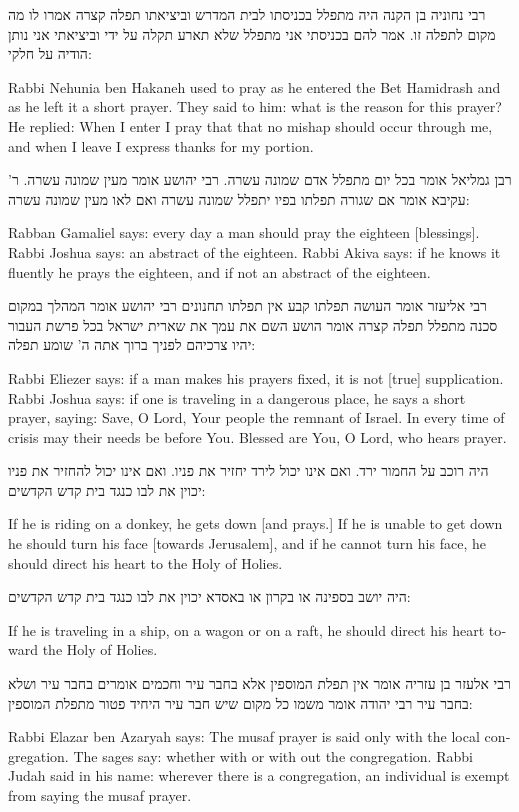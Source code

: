 \documentclass[12pt, openany]{book}
\newcommand{\textblock}[2]{
	{\fontsize{16pt}{20pt}\selectfont #1\\}
	
	\begin{english}
		#2
	\end{english}
	\clearpage
}
\begin{document}
\textblock{רבי נחוניה בן הקנה היה מתפלל בכניסתו לבית המדרש וביציאתו תפלה קצרה אמרו לו מה מקום לתפלה זו. אמר להם בכניסתי אני מתפלל שלא תארע תקלה על ידי וביציאתי אני נותן הודיה על חלקי: }{Rabbi Nehunia ben Hakaneh used to pray as he entered the Bet Hamidrash and as he left it a short prayer. They said to him: what is the reason for this prayer? He replied: When I enter I pray that that no mishap should occur through me, and when I leave I express thanks for my portion.}
\textblock{רבן גמליאל אומר בכל יום מתפלל אדם שמונה עשרה. רבי יהושע אומר מעין שמונה עשרה. ר' עקיבא אומר אם שגורה תפלתו בפיו יתפלל שמונה עשרה ואם לאו מעין שמונה עשרה: }{Rabban Gamaliel says: every day a man should pray the eighteen {[blessings]}. Rabbi Joshua says: an abstract of the eighteen. Rabbi Akiva says: if he knows it fluently he prays the eighteen, and if not an abstract of the eighteen.}
\textblock{רבי אליעזר אומר העושה תפלתו קבע אין תפלתו תחנונים רבי יהושע אומר המהלך במקום סכנה מתפלל תפלה קצרה אומר הושע השם את עמך את שארית ישראל בכל פרשת העבור יהיו צרכיהם לפניך ברוך אתה ה' שומע תפלה: }{Rabbi Eliezer says: if a man makes his prayers fixed, it is not {[true]} supplication. Rabbi Joshua says: if one is traveling in a dangerous place, he says a short prayer, saying: Save, O Lord, Your people the remnant of Israel.  In every time of crisis may their needs be before You. Blessed are You, O Lord, who hears prayer.}
\textblock{היה רוכב על החמור ירד. ואם אינו יכול לירד יחזיר את פניו. ואם אינו יכול להחזיר את פניו יכוין את לבו כנגד בית קדש הקדשים: }{If he is riding on a donkey, he gets down {[and prays.]} If he is unable to get down he should turn his face {[towards Jerusalem]}, and if he cannot turn his face, he should direct his heart to the Holy of Holies.}
\textblock{היה יושב בספינה או בקרון או באסדא יכוין את לבו כנגד בית קדש הקדשים: }{If he is traveling in a ship, on a wagon or on a raft, he should  direct his heart toward the Holy of Holies.}
\textblock{רבי אלעזר בן עזריה אומר אין תפלת המוספין אלא בחבר עיר וחכמים אומרים בחבר עיר ושלא בחבר עיר רבי יהודה אומר משמו כל מקום שיש חבר עיר היחיד פטור מתפלת המוספין: }{Rabbi Elazar ben Azaryah says: The musaf prayer is said only with the local congregation. The sages say: whether with or with out the congregation. Rabbi Judah said in his name: wherever there is a congregation, an individual is exempt from saying the musaf prayer.}
\end{document}
